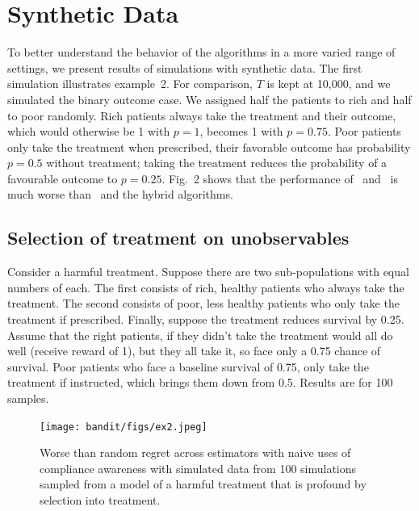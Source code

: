 \section{Synthetic Data}


To better understand the behavior of the algorithms in a more varied range of settings, we present results of simulations with synthetic data.
The first simulation illustrates example~2. For comparison, $T$ is kept at 10,000, and we simulated the binary outcome case. We assigned half the patients to rich and half to poor randomly. Rich patients always take the treatment and their outcome, which would otherwise be 1 with $p=1$, becomes 1 with  $p=0.75$. Poor patients only take the treatment when prescribed, their favorable outcome has probability $p=0.5$ without treatment; taking the treatment reduces the probability of a favourable outcome to $p=0.25$. Fig.~2 shows that the performance of \actual\, and \comply\, is much worse than \chosen\, and the hybrid algorithms.



\subsection{Selection of treatment on unobservables}

Consider a harmful treatment. Suppose there are two sub-populations with equal numbers of each. The first consists of rich, healthy patients who always take the treatment. The second consists of poor, less healthy patients who only take the treatment if prescribed. Finally, suppose the treatment reduces survival by 0.25. Assume that the right patients, if they didn't take the treatment would all do well (receive reward of 1), but they all take it, so face only a 0.75 chance of survival. Poor patients who face a baseline survival of 0.75, only take the treatment if instructed, which brings them down from 0.5. Results are for 100 samples.

%

%


\begin{figure}
	\centering	
	\texttt{[image: bandit/figs/ex2.jpeg]}\hspace{1cm}
	\label{fig:ex2}
	\caption{Worse than random regret across estimators with naive uses of compliance awareness with simulated data from 100 simulations sampled from a model of a harmful treatment that is profound by selection into treatment.}
\end{figure}



